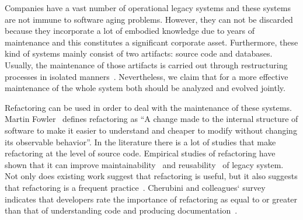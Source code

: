 Companies have a vast number of operational legacy systems and these systems are not immune to software aging problems. However, they can not be discarded because they incorporate a lot of embodied knowledge due to years of maintenance and this constitutes a significant corporate asset. Furthermore, these kind of systems mainly consist of two artifacts: source code and databases. Usually, the maintenance of those artifacts is carried out through restructuring processes in isolated manners~\cite{Griffith2011}. Nevertheless, we claim that for a more effective maintenance of the whole system both should be analyzed and evolved jointly. 

Refactoring can be used in order to deal with the maintenance of these systems. Martin Fowler~\cite{refactImpro} defines refactoring as ``A change made to the internal structure of software to make it easier to understand and cheaper to modify without changing its observable behavior''. In the literature there is a lot of studies that make refactoring at the level of source code. Empirical studies of refactoring have shown that it can improve maintainability~\cite{1510132} and reusability~\cite{Moser:2006} of legacy system. Not only does existing work suggest that refactoring is useful, but it also suggests that refactoring is a frequent practice~\cite{Murphy:2011}. Cherubini and colleagues` survey indicates that developers rate the importance of refactoring as equal to or greater than that of understanding code and producing documentation~\cite{Cherubini:2007}.


